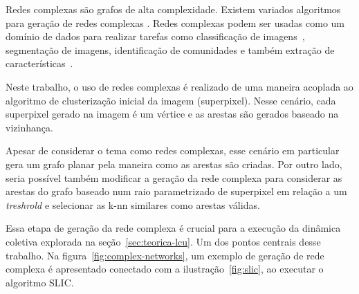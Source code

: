 Redes complexas são grafos de alta complexidade. Existem variados
algoritmos para geração de redes complexas
\cite{ComplexNetworksSurvey2007}. Redes complexas podem ser usadas
como um domínio de dados para realizar tarefas como classificação de
imagens~\cite{ComplexNetworksImageClassification2015}, segmentação de
imagens, identificação de comunidades e também extração de
características~\cite{JarbasComplexNetworks2020}.

Neste trabalho, o uso de redes complexas é realizado de uma maneira
acoplada ao algoritmo de clusterização inicial da imagem (superpixel). Nesse
cenário, cada superpixel gerado na imagem é um vértice e as arestas
são gerados baseado na vizinhança.

Apesar de considerar o tema como redes complexas, esse cenário em
particular gera um grafo planar pela maneira como as arestas são
criadas. Por outro lado, seria possível também modificar a geração da
rede complexa para considerar as arestas do grafo baseado num raio
parametrizado de superpixel em relação a um \textit{treshrold} e
selecionar as k-nn similares como arestas válidas.

Essa etapa de geração da rede complexa é crucial para a execução da
dinâmica coletiva explorada na seção~\ref{sec:teorica-lcu}. Um dos
pontos centrais desse trabalho. Na figura~\ref{fig:complex-networks},
um exemplo de geração de rede complexa é apresentado conectado com a
ilustração~\ref{fig:slic}, ao executar o algoritmo SLIC.

\begin{figure}[t]
        \captionsetup{width=12cm}
		\centering
\end{figure}
\FloatBarrier{}

